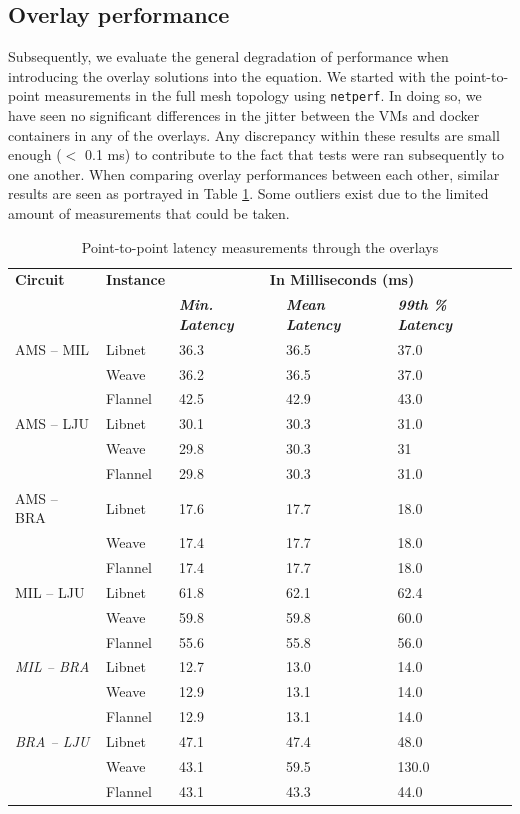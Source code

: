 \subsection{Overlay performance} \label{synthetic}
Subsequently, we evaluate the general degradation of performance when introducing the overlay solutions into the equation. We started with the point-to-point measurements in the full mesh topology using \texttt{netperf}. In doing so, we have seen no significant differences in the jitter between the VMs and docker containers in any of the overlays. Any discrepancy within these results are small enough ($<$ 0.1 ms) to contribute to the fact that tests were ran subsequently to one another. When comparing overlay performances between each other, similar results are seen as portrayed in Table \ref{tab:PtP_Overlays_Latency}. Some outliers exist due to the limited amount of measurements that could be taken.
\\
\begin{table}[!ht]
\centering
\begin{tabular}{@{}lllll@{}}
\toprule
\textbf{Circuit} & \textbf{Instance} & \multicolumn{3}{c}{\textbf{In Milliseconds (ms)}} \\
\textbf{} & \textbf{} & \textit{\textbf{Min. Latency}} & \textit{\textbf{Mean Latency}} & \textit{\textbf{99th \% Latency}} \\ \midrule
AMS – MIL & Libnet & 36.3 & 36.5 & 37.0 \\
 & Weave & 36.2 & 36.5 & 37.0 \\
 & Flannel & 42.5 & 42.9 & 43.0 \\ \midrule
AMS – LJU & Libnet & 30.1 & 30.3 & 31.0 \\
 & Weave & 29.8 & 30.3 & 31 \\
 & Flannel & 29.8 & 30.3 & 31.0 \\ \midrule
AMS – BRA & Libnet & 17.6 & 17.7 & 18.0 \\
 & Weave & 17.4 & 17.7 & 18.0 \\
 & Flannel & 17.4 & 17.7 & 18.0 \\ \midrule
MIL – LJU & Libnet & 61.8 & 62.1 & 62.4 \\
\textit{} & Weave & 59.8 & 59.8 & 60.0 \\
\textit{} & Flannel & 55.6 & 55.8 & 56.0 \\ \midrule
\textit{MIL – BRA} & Libnet & 12.7 & 13.0 & 14.0 \\
\textit{} & Weave & 12.9 & 13.1 & 14.0 \\
\textit{} & Flannel & 12.9 & 13.1 & 14.0 \\ \midrule
\textit{BRA – LJU} & Libnet & 47.1 & 47.4 & 48.0 \\
\textit{} & Weave & 43.1 & 59.5 & 130.0 \\
\textit{} & Flannel & 43.1 & 43.3 & 44.0 \\ \bottomrule
\end{tabular}
\caption{Point-to-point latency measurements through the overlays }
\label{tab:PtP_Overlays_Latency}
\end{table}

